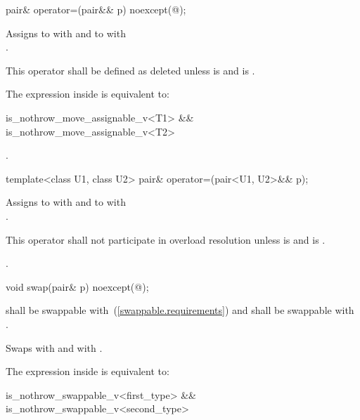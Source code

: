 %
\begin{itemdecl}
pair& operator=(pair&& p) noexcept(@\seebelow@);
\end{itemdecl}

\begin{itemdescr}
\pnum
\effects
Assigns to  with 
and to  with\\ .

\pnum
\remarks This operator shall be defined as deleted unless
 is 
and  is .

\pnum
\remarks The expression inside  is equivalent to:
\begin{codeblock}
is_nothrow_move_assignable_v<T1> && is_nothrow_move_assignable_v<T2>
\end{codeblock}

\pnum
\returns {}.
\end{itemdescr}

%
\begin{itemdecl}
template<class U1, class U2> pair& operator=(pair<U1, U2>&& p);
\end{itemdecl}

\begin{itemdescr}
\pnum
\effects
Assigns to  with 
and to  with\\ .

\pnum
\remarks This operator shall not participate in overload resolution unless
 is 
and  is .

\pnum
\returns {}.
\end{itemdescr}

%
\begin{itemdecl}
void swap(pair& p) noexcept(@\seebelow@);
\end{itemdecl}

\begin{itemdescr}
\pnum
\requires
{} shall be swappable with~(\ref{swappable.requirements})
 and  shall be swappable with .

\pnum
\effects Swaps
 with  and
 with .

\pnum
\remarks The expression inside  is equivalent to:
\begin{codeblock}
is_nothrow_swappable_v<first_type> && is_nothrow_swappable_v<second_type>
\end{codeblock}
\end{itemdescr}

